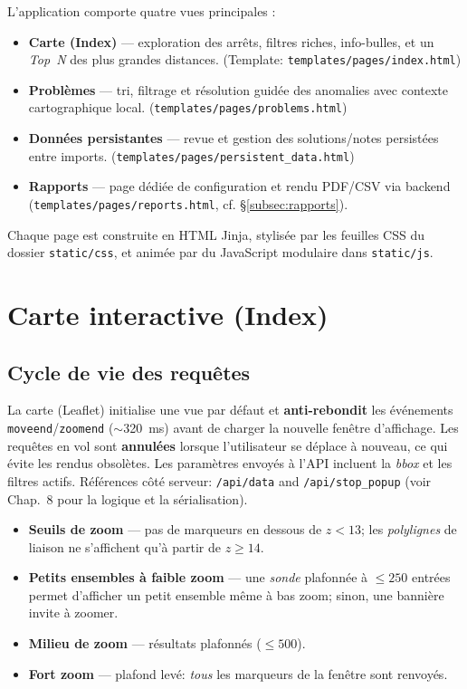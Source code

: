 L'application comporte quatre vues principales :
\begin{itemize}
  \item \textbf{Carte (Index)} — exploration des arrêts, filtres riches, info-bulles, et un \emph{Top~N} des plus grandes distances. (Template: \texttt{templates/pages/index.html})
  \item \textbf{Problèmes} — tri, filtrage et résolution guidée des anomalies avec contexte cartographique local. (\texttt{templates/pages/problems.html})
  \item \textbf{Données persistantes} — revue et gestion des solutions/notes persistées entre imports. (\texttt{templates/pages/persistent\_data.html})
  \item \textbf{Rapports} — page dédiée de configuration et rendu PDF/CSV via backend (\texttt{templates/pages/reports.html}, cf. \S\ref{subsec:rapports}).
\end{itemize}

Chaque page est construite en HTML Jinja, stylisée par les feuilles CSS du dossier \texttt{static/css}, et animée par du JavaScript modulaire dans \texttt{static/js}.

\section{Carte interactive (Index)}

\subsection{Cycle de vie des requêtes}
La carte (Leaflet) initialise une vue par défaut et \textbf{anti-rebondit} les événements \texttt{moveend}/\texttt{zoomend} (\(\sim\)320~ms) avant de charger la nouvelle fenêtre d'affichage. Les requêtes en vol sont \textbf{annulées} lorsque l'utilisateur se déplace à nouveau, ce qui évite les rendus obsolètes. Les paramètres envoyés à l'API incluent la \textit{bbox} et les filtres actifs. Références côté serveur: \texttt{/api/data} and \texttt{/api/stop\_popup} (voir Chap.~8 pour la logique et la sérialisation).

\begin{itemize}
  \item \textbf{Seuils de zoom} — pas de marqueurs en dessous de \(z<13\); les \textit{polylignes} de liaison ne s'affichent qu'à partir de \(z\ge 14\).
  \item \textbf{Petits ensembles à faible zoom} — une \textit{sonde} plafonnée à \(\leq 250\) entrées permet d'afficher un petit ensemble même à bas zoom; sinon, une bannière invite à zoomer.
  \item \textbf{Milieu de zoom} — résultats plafonnés (\(\leq 500\)).
  \item \textbf{Fort zoom} — plafond levé: \emph{tous} les marqueurs de la fenêtre sont renvoyés.
\end{itemize}

